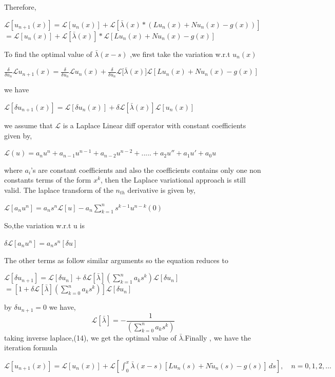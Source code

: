 \documentclass[12pt, a4paper]{report}
\begin{document}
Therefore,
\begin{center}
    $\mathcal{L}[u_{n+1}(x)] = \mathcal{L}[u_n(x)] + \mathcal{L}[\bar{\lambda}(x) * (Lu_n(x) + Nu_n(x) - g(x))]$ \\
    $= \mathcal{L}[u_n(x)] + \mathcal{L}[\bar{\lambda}(x)] * \mathcal{L}[Lu_n(x) + Nu_n(x) - g(x)]$
\end{center}
To find the optimal value of $\bar {\lambda} (x-s)$ ,we first take the variation w.r.t $u_n(x)$
\begin{center}
    $\frac{\delta}{\delta u_{n}}\mathcal{L}{u_{n+1}(x)} = \frac{\delta}{\delta u_{n}} \mathcal{L}{u_n(x)}+ \frac{\delta}{\delta u_{n}}\mathcal{L}[{\bar{\lambda}(x)]\mathcal{L}[Lu_n(x)+Nu_n(x)-g(x)]}$
\end{center}
we have 
\begin{center}
    $\mathcal{L}[\delta u_{n+1}(x)] = \mathcal{L}[\delta {u_n(x)}] +\delta \mathcal{L}[\bar{\lambda}(x)]\mathcal{L}[u_n(x)]$
\end{center}
we assume that $\mathcal{L}$ is a Laplace Linear diff operator with constant coefficients given by,
\begin{center}
    $\mathcal{L}(u) = a_n u^{n}+a_{n-1}u^{n-1}+a_{n-2}u^{n-2}+.....+a_2 u''+a_1 u'+a_0 u$
\end{center}
where $a_i$'s are constant coefficients and also the coefficients contains only one non constants terms of the form $x^{k}$, then the Laplace variational approach is still valid.
The laplace transform of the $n_{th}$ derivative is given by,
\begin{center}
    $\mathcal{L}[a_n u^{n}] = a_n s^{n} \mathcal{L}[u] - a_n \sum_{k=1}^{n} s^{k-1} u^{n-k} (0)$
\end{center}
So,the variation w.r.t u is
\begin{center}
    $\delta \mathcal{L}[a_n u^n] = a_n s^n [\delta u]$
\end{center}
The other terms as follow similar arguments so the equation reduces to 
\begin{center}
    $\mathcal{L}[\delta u_{n+1}] = \mathcal{L}[\delta u_n] + \delta \mathcal{L}[\bar{\lambda}] \left(\sum_{k=1}^{n} a_k s^k\right) \mathcal{L}[\delta u_n]$ \\
    $= \left[1 + \delta \mathcal{L}[\bar{\lambda}]\left(\sum_{k=0}^{n} a_k s^k\right)\right] \mathcal{L}[\delta u_n]$
\end{center}

by $\delta u_{n+1} = 0$ we have, \begin{equation}
    \mathcal{L}[\bar{\lambda}] = - \frac{1}{(\sum_{k=0}^{n} a_k s^k)}
\end{equation}
taking inverse laplace,(14), we get the optimal value of $\bar{\lambda}$.Finally , we have the iteration formula
\begin{center}
    $\mathcal{L}[u_{n+1}(x)] = \mathcal{L}[u_n(x)] + \mathcal{L}\left[\int_{0}^{x} \bar{\lambda}(x-s) [Lu_n(s) + N\tilde{u}_n(s) - g(s)] \, ds\right], \quad n = 0, 1, 2, \dots$
\end{center}
\end{document}
